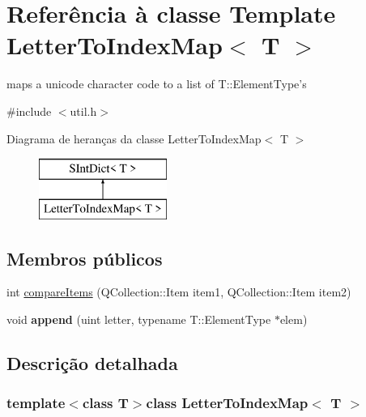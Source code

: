 \hypertarget{class_letter_to_index_map}{\section{Referência à classe Template Letter\-To\-Index\-Map$<$ T $>$}
\label{class_letter_to_index_map}
}


maps a unicode character code to a list of T\-::\-Element\-Type's  




{\ttfamily \#include $<$util.\-h$>$}

Diagrama de heranças da classe Letter\-To\-Index\-Map$<$ T $>$\begin{figure}[H]
\begin{center}
\leavevmode
\includegraphics[height=2.000000cm]{class_letter_to_index_map}
\end{center}
\end{figure}
\subsection*{Membros públicos}
\begin{DoxyCompactItemize}
\item 
int \hyperlink{class_letter_to_index_map_a219450accf048597ffc7113ecde4c402}{compare\-Items} (Q\-Collection\-::\-Item item1, Q\-Collection\-::\-Item item2)
\item 
\hypertarget{class_letter_to_index_map_a348e851a4bddff93c998b0cf7c1565d6}{void {\bfseries append} (uint letter, typename T\-::\-Element\-Type $\ast$elem)}\label{class_letter_to_index_map_a348e851a4bddff93c998b0cf7c1565d6}

\end{DoxyCompactItemize}


\subsection{Descrição detalhada}
\subsubsection*{template$<$class T$>$class Letter\-To\-Index\-Map$<$ T $>$}

